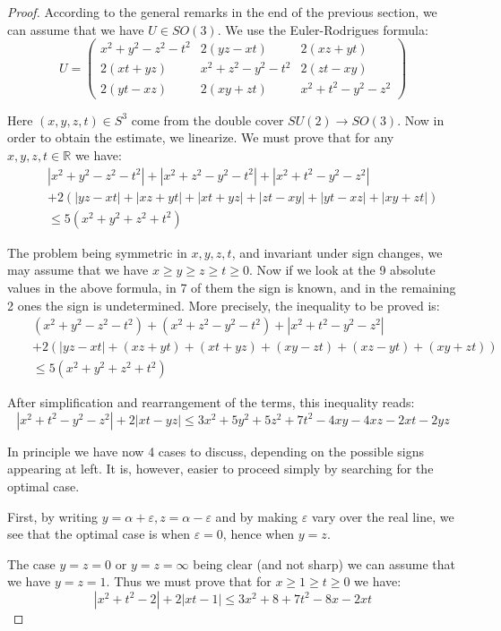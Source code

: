 \documentclass[12pt]{amsart}
\begin{document}
\begin{proof}
According to the general remarks in the end of the previous section, we can assume that we have $U\in SO(3)$. We use the Euler-Rodrigues formula:
$$U=\begin{pmatrix}
x^2+y^2-z^2-t^2&2(yz-xt)&2(xz+yt)\\
2(xt+yz)&x^2+z^2-y^2-t^2&2(zt-xy)\\
2(yt-xz)&2(xy+zt)&x^2+t^2-y^2-z^2
\end{pmatrix}$$

Here $(x,y,z,t)\in S^3$ come from the double cover $SU(2)\to SO(3)$. Now in order to obtain the estimate, we linearize. We must prove that for any $x,y,z,t\in\mathbb R$ we have:
\begin{eqnarray*}
&&|x^2+y^2-z^2-t^2|+|x^2+z^2-y^2-t^2|+|x^2+t^2-y^2-z^2|\\
&&+2\left(|yz-xt|+|xz+yt|+|xt+yz|+|zt-xy|+|yt-xz|+|xy+zt|\right)\\
&&\leq 5(x^2+y^2+z^2+t^2)
\end{eqnarray*}

The problem being symmetric in $x,y,z,t$, and invariant under sign changes, we may assume that we have $x\geq y\geq z\geq t\geq 0$. Now if we look at the 9 absolute values in the above formula, in 7 of them the sign is known, and in the remaining 2 ones the sign is undetermined. More precisely, the inequality to be proved is:
\begin{eqnarray*}
&&(x^2+y^2-z^2-t^2)+(x^2+z^2-y^2-t^2)+|x^2+t^2-y^2-z^2|\\
&&+2\left(|yz-xt|+(xz+yt)+(xt+yz)+(xy-zt)+(xz-yt)+(xy+zt)\right)\\
&&\leq 5(x^2+y^2+z^2+t^2)
\end{eqnarray*}

After simplification and rearrangement of the terms, this inequality reads:
$$|x^2+t^2-y^2-z^2|+2|xt-yz|\leq 3x^2+5y^2+5z^2+7t^2-4xy-4xz-2xt-2yz$$

In principle we have now 4 cases to discuss, depending on the possible signs appearing at left. It is, however, easier to proceed simply by searching for the optimal case. 

First, by writing $y=\alpha+\varepsilon,z=\alpha-\varepsilon$ and by making $\varepsilon$ vary over the real line, we see that the optimal case is when $\varepsilon=0$, hence when $y=z$. 

The case $y=z=0$ or $y=z=\infty$ being clear (and not sharp) we can assume that we have $y=z=1$. Thus we must prove that for $x\geq 1\geq t\geq 0$ we have:
$$|x^2+t^2-2|+2|xt-1|\leq 3x^2+8+7t^2-8x-2xt$$


\end{proof}
\end{document}
